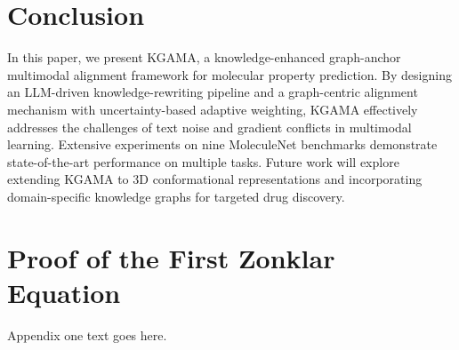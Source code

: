 \documentclass[journal]{IEEEtran}
\begin{document}


\section{Conclusion}
In this paper, we present KGAMA, a knowledge-enhanced graph-anchor multimodal alignment framework for molecular property prediction. By designing an LLM-driven knowledge-rewriting pipeline and a graph-centric alignment mechanism with uncertainty-based adaptive weighting, KGAMA effectively addresses the challenges of text noise and gradient conflicts in multimodal learning. Extensive experiments on nine MoleculeNet benchmarks demonstrate state-of-the-art performance on multiple tasks. Future work will explore extending KGAMA to 3D conformational representations and incorporating domain-specific knowledge graphs for targeted drug discovery.






%


\appendices
\section{Proof of the First Zonklar Equation}
Appendix one text goes here.
\end{document}
